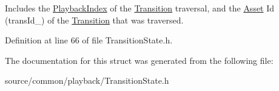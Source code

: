 Includes the \hyperlink{struct_picto_1_1_playback_index}{Playback\-Index} of the \hyperlink{class_picto_1_1_transition}{Transition} traversal, and the \hyperlink{class_picto_1_1_asset}{Asset} Id (trans\-Id\-\_\-) of the \hyperlink{class_picto_1_1_transition}{Transition} that was traversed. 

Definition at line 66 of file Transition\-State.\-h.



The documentation for this struct was generated from the following file\-:\begin{DoxyCompactItemize}
\item 
source/common/playback/Transition\-State.\-h\end{DoxyCompactItemize}
